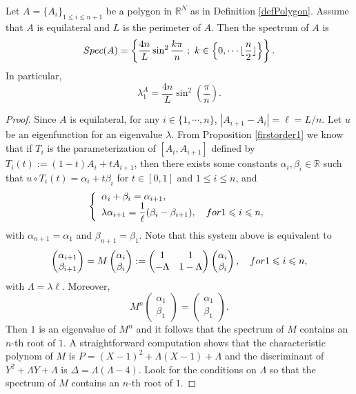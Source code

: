\documentclass[10pt,a4paper]{amsart}
\newcommand{\R}{\mathbb{R}}
\begin{document}
\medskip\begin{proposition}\label{Spectrum-Equilateral-Gon} Let $A=\{A_i\}_{1\leqslant i \leqslant n+1}$ be a polygon in $\R^N$ as in Definition \ref{defPolygon}. Assume that $A$ is equilateral and $L$ is the perimeter of $A$. Then  the spectrum of $A$ is 
$$\textnormal{Spec}(A)=\left\{\frac{4n}{L}\sin^2\frac{k\pi}{n}\ ; \ k\in\left\{0,\cdots\lfloor\dfrac{n}{2}\rfloor\right\}\right\}.$$
In particular,
$$\lambda_1^A=\frac{4n}{L}\sin^2\left(\frac{\pi}{n}\right).$$
\end{proposition}

\begin{proof} Since $A$ is equilateral, for any $i\in\{1,\cdots,n\}$, $|A_{i+1}-A_i|=\ell=L/n$. Let $u$ be an eigenfunction for an eigenvalue $\lambda$. From Proposition \ref{firstorder1} we know that if  $T_i$ is the parameterization of $[A_i,A_{i+1}]$ defined by $T_i(t) := (1-t)A_i + tA_{i+1}$, then there exists some constants $\alpha_i,\beta_i \in \R$ such that $u\circ T_i(t)=\alpha_i +t \beta_i$ for $t\in[0,1]$ and $ 1\leqslant i \leqslant n$, and 
$$
\left\{
 \begin{array}{ll}
\alpha_i+\beta_i=\alpha_{i+1},\\
\lambda\alpha_{i+1}=\dfrac{1}{\ell}(\beta_i-\beta_{i+1}), \quad \textnormal{ for } 1\leqslant i  \leqslant n,
 \end{array}
  \right. 
 $$
with $\alpha_{n+1}=\alpha_1$ and $\beta_{n+1}=\beta_1$. Note that this system above is equivalent to
\begin{equation}\label{equivalence-system}
 \begin{pmatrix}
\alpha_{i+1}\\\beta_{i+1}
\end{pmatrix}=M\begin{pmatrix}
\alpha_i\\\beta_i
\end{pmatrix}:=\begin{pmatrix}
1&1\\-\Lambda&1-\Lambda
\end{pmatrix}\begin{pmatrix}
\alpha_i\\\beta_i
\end{pmatrix},\quad \textnormal{ for }1\leqslant i  \leqslant n,
\end{equation}
with $\Lambda = \lambda \ell$. Moreover, $$M^n\begin{pmatrix}
\alpha_1\\\beta_1
\end{pmatrix}=\begin{pmatrix}
\alpha_1\\\beta_1
\end{pmatrix}.$$ Then $1$ is an eigenvalue of $M^n$ and it follows that the spectrum of $M$ contains an $n$-th root of $1$. A straightforward computation shows that the characteristic polynom of $M$ is $P=(X-1)^2+\Lambda(X-1)+\Lambda$ and the discriminant of $Y^2+\Lambda Y+\Lambda$ is $\Delta=\Lambda(\Lambda-4)$. Look for the conditions on $\Lambda$ so that the spectrum of $M$ contains an $n$-th root of $1$. 


\end{proof}
\end{document}
